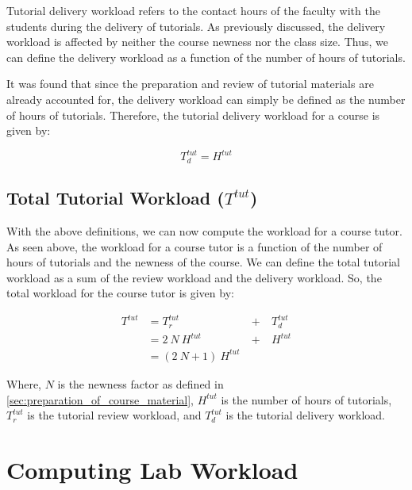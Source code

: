Tutorial delivery workload refers to the contact hours of the faculty with the students during the delivery of tutorials. As previously discussed, the delivery workload is affected by neither the course newness nor the class size. Thus, we can define the delivery workload as a function of the number of hours of tutorials.

It was found that since the preparation and review of tutorial materials are already accounted for, the delivery workload can simply be defined as the number of hours of tutorials. Therefore, the tutorial delivery workload for a course is given by:

\begin{equation}
  \label{eqn:tutorial-delivery-workload}
  T_d^{tut} = H^{tut}
\end{equation}

\subsection{Total Tutorial Workload (\texorpdfstring{\(T^{tut}\)}{})}

With the above definitions, we can now compute the workload for a course tutor. As seen above, the workload for a course tutor is a function of the number of hours of tutorials and the newness of the course. We can define the total tutorial workload as a sum of the review workload and the delivery workload. So, the total workload for the course tutor is given by:

\begin{equation}
  \begin{aligned}
    T^{tut} & = T_r^{tut}           & \ +\  & T_d^{tut} \\
            & = 2\ N\ H^{tut}       & \ +\  & H^{tut}   \\
            & = (2\ N + 1)\ H^{tut}
  \end{aligned}
  \label{eqn:tutorial-workload}
\end{equation}

Where, \(N\) is the newness factor as defined in \autoref{sec:preparation_of_course_material}, \(H^{tut}\) is the number of hours of tutorials, \(T_r^{tut}\) is the tutorial review workload, and \(T_d^{tut}\) is the tutorial delivery workload.

\section{Computing Lab Workload}

